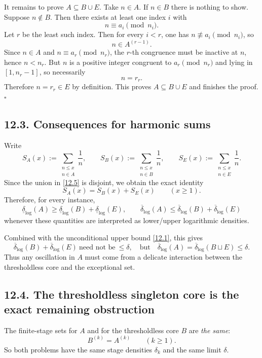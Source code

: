 It remains to prove $A\subseteq B\cup E$.  Take $n\in A$.  If $n\in B$ there is nothing to show.  Suppose $n\notin B$.  Then there exists at least one index $i$ with
\[
n\equiv a_i\pmod{n_i}.
\]
Let $r$ be the least such index.  Then for every $i<r$, one has $n\not\equiv a_i\pmod{n_i}$, so
\[
n\in A^{(r-1)}.
\]
Since $n\in A$ and $n\equiv a_r\pmod{n_r}$, the $r$-th congruence must be inactive at $n$, hence $n<n_r$.  But $n$ is a positive integer congruent to $a_r\pmod{n_r}$ and lying in $[1,n_r-1]$, so necessarily
\[
n=r_r.
\]
Therefore $n=r_r\in E$ by definition.  This proves $A\subseteq B\cup E$ and finishes the proof. \hfill $\square$

\subsection*{12.3. Consequences for harmonic sums}
Write
\[
S_A(x):=\sum_{\substack{n\le x\\ n\in A}}\frac1n,
\qquad
S_B(x):=\sum_{\substack{n\le x\\ n\in B}}\frac1n,
\qquad
S_E(x):=\sum_{\substack{n\le x\\ n\in E}}\frac1n.
\]
Since the union in \eqref{12.5} is disjoint, we obtain the exact identity
\begin{equation}
S_A(x)=S_B(x)+S_E(x)
\qquad (x\ge 1).
\tag{12.6}
\end{equation}
Therefore, for every instance,
\begin{equation}
\underline\delta_{\log}(A)
\ge
\underline\delta_{\log}(B)+\underline\delta_{\log}(E),
\qquad
\overline\delta_{\log}(A)
\le
\overline\delta_{\log}(B)+\overline\delta_{\log}(E)
\tag{12.7}
\end{equation}
whenever these quantities are interpreted as lower/upper logarithmic densities.

Combined with the unconditional upper bound \eqref{12.1}, this gives
\begin{equation}
\overline\delta_{\log}(B)+\overline\delta_{\log}(E)
\ \text{need not be}\ \le \delta,
\quad\text{but}
\quad
\overline\delta_{\log}(A)=\overline\delta_{\log}(B\sqcup E)\le \delta.
\tag{12.8}
\end{equation}
Thus any oscillation in $A$ must come from a delicate interaction between the thresholdless core and the exceptional set.

\subsection*{12.4. The thresholdless singleton core is the exact remaining obstruction}
The finite-stage sets for $A$ and for the thresholdless core $B$ are \emph{the same}:
\[
B^{(k)}=A^{(k)}
\qquad (k\ge 1).
\]
So both problems have the same stage densities $\delta_k$ and the same limit $\delta$.

